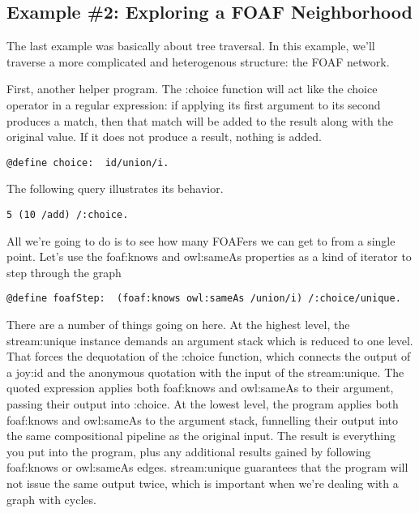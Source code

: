 \documentclass[runningheads]{llncs}
\begin{document}
\subsection{Example \#2: Exploring a FOAF Neighborhood}

The last example was basically about tree traversal.  In this example, we'll traverse a more complicated and heterogenous structure: the FOAF network.

First, another helper program.  The :choice function will act like the choice operator in a regular expression: if applying its first argument to its second produces a match, then that match will be added to the result along with the original value.  If it does not produce a result, nothing is added.

\begin{verbatim}
@define choice:  id/union/i.
\end{verbatim}

The following query illustrates its behavior.

\begin{verbatim}
5 (10 /add) /:choice.
\end{verbatim}

All we're going to do is to see how many FOAFers we can get to from a single point.  Let's use the foaf:knows and owl:sameAs properties as a kind of iterator to step through the graph

\begin{verbatim}
@define foafStep:  (foaf:knows owl:sameAs /union/i) /:choice/unique.
\end{verbatim}

There are a number of things going on here.  At the highest level, the stream:unique instance demands an argument stack which is reduced to one level.  That forces the dequotation of the :choice function, which connects
the output of a joy:id and the anonymous quotation with the input of the stream:unique.  The quoted expression applies both foaf:knows and owl:sameAs to their argument, passing their output into :choice.  At the lowest level, the program
applies both foaf:knows and owl:sameAs to the argument stack, funnelling their output into the same compositional
pipeline as the original input.  The result is everything you put into the program, plus any additional results gained by following foaf:knows or owl:sameAs edges.  stream:unique guarantees that the program will not issue the same output twice, which is important when we're dealing with a graph with cycles.
\end{document}
